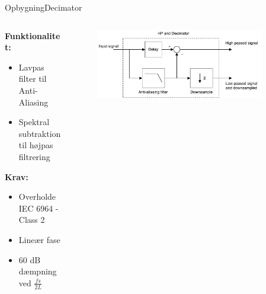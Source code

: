 \begin{frame}{Opbygning}{Decimator}

\begin{columns}
  \begin{column}{0.4\textwidth}
  \textbf{Funktionalitet:}
\begin{itemize}
\item Lavpas filter til Anti-Aliasing
\item Spektral subtraktion til højpas filtrering 
\end{itemize}

\textbf{Krav:}
\begin{itemize}
\item Overholde IEC 6964 - Class 2
\item Lineær fase
\item 60 dB dæmpning ved $\frac{fs}{2L}$
\end{itemize}
  \end{column}
  \begin{column}{0.6\textwidth}
\begin{figure}
\centering
\includegraphics[width=0.9\textwidth]{designRealDecimator}
\end{figure}
  \end{column}
\end{columns}
\end{frame}


